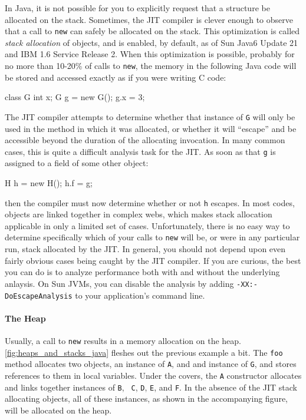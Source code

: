 In Java, it is not possible for you to explicitly request that a structure be
allocated on the stack. Sometimes, the JIT compiler is clever enough to observe
that a call to {\tt new} can safely be allocated on the stack. This optimization
is called \emph{stack allocation} of objects, and is
enabled, by default, as of Sun Java6 Update 21 and IBM 1.6 Service Release 2.
When this optimization is possible, probably for no more than 10-20\% of calls
to {\tt new}, the memory in the following Java code will be stored and accessed
exactly as if you were writing C code:
\begin{shortlisting}
class G {
   int x;
}
G g = new G();
g.x = 3;
\end{shortlisting}
The JIT compiler attempts to determine whether that instance of {\tt G} will
only be used in the method in which it was allocated, or whether it will
``escape'' and be accessible beyond the duration of the allocating
invocation. In many common cases, this is quite a
difficult analysis task for the JIT. As soon as that {\tt g} is assigned to a
field of some other object:
\begin{shortlisting}
H h = new H();
h.f = g;
\end{shortlisting}
then the compiler must now determine whether or not {\tt h} escapes. In most
codes, objects are linked together in complex webs, which makes stack allocation
applicable in only a limited set of cases. Unfortunately, there is no easy way
to determine specifically which of your calls to {\tt new} will be, or were in
any particular run, stack allocated by the JIT. In general, you should not
depend upon even fairly obvious cases being caught by the JIT compiler. If you
are curious, the best you can do is to analyze performance both with and without
the underlying anlaysis. On Sun JVMs, you can disable the analysis by adding
{\tt -XX:-DoEscapeAnalysis} to your application's command line.

\paragraph{The Heap}
Usually, a call to {\tt new} results in a memory allocation on the heap.
\autoref{fig:heaps_and_stacks_java} fleshes out the previous example a bit. The
{\tt foo} method allocates two objects, an instance of {\tt A}, and and instance
of {\tt G}, and stores references to them in local variables. Under the covers,
the {\tt A} constructor allocates and links together instances of {\tt B}, {\tt
C}, {\tt D}, {\tt E}, and {\tt F}. In the absence of the JIT stack allocating
objects, all of these instances, as shown in the accompanying figure, will be
allocated on the heap.

